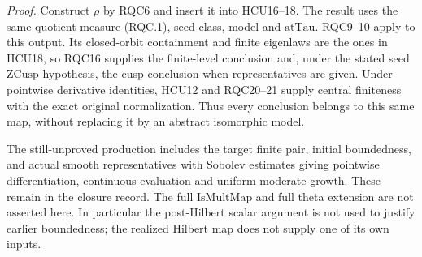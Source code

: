 \documentclass[11pt,a4paper]{article}
\numberwithin{equation}{section}
\theoremstyle{remark}\newtheorem{remark}[theorem]{Remark}
\begin{document}
\emph{Proof.}
Construct \(\rho\) by RQC6 and insert it into HCU16--18.
The result uses the same quotient measure (RQC.1), seed class,
model and \(\mathrm{atTau}\).  RQC9--10 apply to this output.
Its closed-orbit containment and finite eigenlaws are the ones in
HCU18, so RQC16 supplies the finite-level conclusion and,
under the stated seed \(\mathrm{ZCusp}\) hypothesis, the cusp
conclusion when representatives are given.  Under pointwise derivative
identities, HCU12 and RQC20--21 supply central finiteness with
the exact original normalization.
Thus every conclusion belongs to this same map, without
replacing it by an abstract isomorphic model.

The still-unproved production includes the target finite pair,
initial boundedness, and actual smooth representatives with
Sobolev estimates giving pointwise differentiation, continuous
evaluation and uniform moderate growth.  These remain in the
closure record.  The full \(\mathrm{IsMultMap}\) and full theta
extension are not asserted here.  In particular the post-Hilbert
scalar argument is not used to justify earlier boundedness;
the realized Hilbert map does not supply one of its own inputs.
\end{document}
